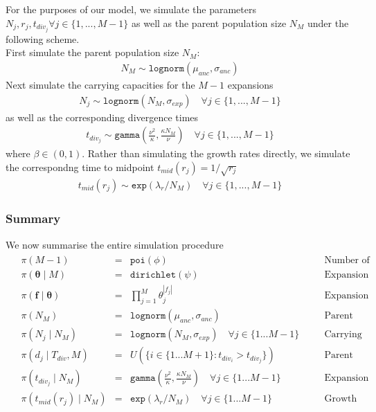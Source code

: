 \documentclass{report}
\theoremstyle{definition}
\begin{document}
For the purposes of our model, we simulate the parameters $N_j, r_j, t_{div_j} \forall j \in \{1,...,M-1\}$ as well as the parent population size $N_{M}$ under the following scheme.\\
First simulate the parent population size $N_{M}$:
\begin{gather}
N_{M} \sim \texttt{lognorm}(\mu_{anc}, \sigma_{anc})
\end{gather}
Next simulate the carrying capacities for the $M-1$ expansions
\begin{gather}
N_{j} \sim \texttt{lognorm}(N_{M}, \sigma_{exp}) \quad\forall j \in \{1,...,M-1\}
\end{gather}
as well as the corresponding divergence times
\begin{gather}
t_{div_j} \sim \texttt{gamma}\left(\frac{\nu^2}{\kappa}, \frac{\kappa N_M}{\nu}\right) \quad\forall j \in \{1,...,M-1\}
\end{gather}
where $\beta \in (0,1)$.
Rather than simulating the growth rates directly, we simulate the correspondng time to midpoint $t_{mid}(r_j) = 1/\sqrt{r_j}$
\begin{gather}
t_{mid}(r_j) \sim \texttt{exp}(\lambda_r/N_M) \quad\forall j \in \{1,...,M-1\}
\end{gather} 
\subsubsection{Summary}
We now summarise the entire simulation procedure
\begin{gather}
\begin{aligned}
&\pi(M-1) &=& \texttt{poi}(\phi) &\quad&\text{Number of expansions} \\
&\pi(\pmb\theta\mid M) &=& \texttt{dirichlet}(\psi) &\quad&\text{Expansion Membership Probabilities} \\
&\pi(\mathbf{f\mid\pmb\theta}) &=& \prod\limits_{j=1}^M\theta_j^{|f_j|}&\quad&\text{Expansion Membership Assignment} \\
&\pi(N_M) &=& \texttt{lognorm}(\mu_{anc},\sigma_{anc}) &\quad&\text{Parent Population Size}\\
&\pi(N_j\mid N_{M}) &=& \texttt{lognorm}(N_{M},\sigma_{exp})\quad\forall j \in \{1...M-1\} &\quad&\text{Carrying Capacities}\\
&\pi(d_j\mid T_{div}, M) &=& U(\{i\in \{1 ... M+1\} : t_{div_i} > t_{div_j}\}) &\quad&\text{Parent Populations}\\
&\pi(t_{div_j}\mid N_{M}) &=& \texttt{gamma}\left(\frac{\nu^2}{\kappa}, \frac{\kappa N_M}{\nu}\right) \quad\forall j \in \{1...M-1\} &\quad&\text{Expansion Times}\\
&\pi(t_{mid}(r_j)\mid N_M) &=& \texttt{exp}(\lambda_{r}/N_M)\quad\forall j \in \{1...M-1\} &\quad&\text{Growth Rates/Time to Midpoint}
\end{aligned}
\end{gather}
\end{document}
